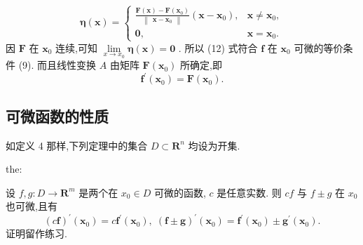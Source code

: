 \[
\mathbf{\eta }\left( \mathbf{x}\right)  = \left\{  \begin{array}{ll} \frac{\mathbf{F}\left( \mathbf{x}\right)  - \mathbf{F}\left( {\mathbf{x}}_{0}\right) }{\begin{Vmatrix}\mathbf{x} - {\mathbf{x}}_{0}\end{Vmatrix}}\left( {\mathbf{x} - {\mathbf{x}}_{0}}\right) , & \mathbf{x} \neq  {\mathbf{x}}_{0}, \\  \mathbf{0}, & \mathbf{x} = {\mathbf{x}}_{0}. \end{array}\right.  \tag{12}
\]
因 \(\mathbf{F}\) 在 \({\mathbf{x}}_{0}\) 连续,可知 \(\mathop{\lim }\limits_{{x \rightarrow  {x}_{0}}}\mathbf{\eta }\left( \mathbf{x}\right)  = \mathbf{0}\) . 所以 (12) 式符合 \(\mathbf{f}\) 在 \({\mathbf{x}}_{0}\) 可微的等价条件 (9). 而且线性变换 \(A\) 由矩阵 \(\mathbf{F}\left( {\mathbf{x}}_{0}\right)\) 所确定,即
\[
{\mathbf{f}}^{\prime }\left( {\mathbf{x}}_{0}\right)  = \mathbf{F}\left( {\mathbf{x}}_{0}\right) . \tag{13}
\]
\subsection{可微函数的性质}

如定义 4 那样,下列定理中的集合 \(D \subset  {\mathbf{R}}^{n}\) 均设为开集.

\begin{theorem}{}{the:}

\end{theorem}
 设 \(f,g : D \rightarrow  {\mathbf{R}}^{m}\) 是两个在 \({x}_{0} \in  D\) 可微的函数, \(c\) 是任意实数. 则 \({cf}\) 与 \(f \pm  g\) 在 \({x}_{0}\) 也可微,且有
\[
{\left( c\mathbf{f}\right) }^{\prime }\left( {\mathbf{x}}_{0}\right)  = c{\mathbf{f}}^{\prime }\left( {\mathbf{x}}_{0}\right) ,\;{\left( \mathbf{f} \pm  \mathbf{g}\right) }^{\prime }\left( {\mathbf{x}}_{0}\right)  = {\mathbf{f}}^{\prime }\left( {\mathbf{x}}_{0}\right)  \pm  {\mathbf{g}}^{\prime }\left( {\mathbf{x}}_{0}\right) . \tag{14}
\]
证明留作练习.

